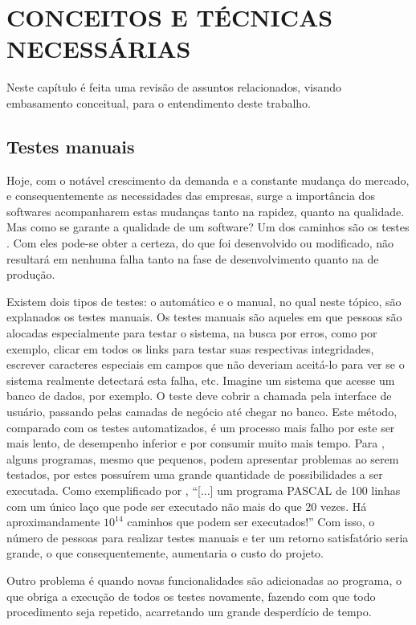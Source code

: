 \chapter{CONCEITOS E TÉCNICAS NECESSÁRIAS}

Neste capítulo é feita uma revisão de assuntos relacionados, visando embasamento conceitual, para o entendimento deste trabalho.

\section{Testes manuais}

Hoje, com o notável crescimento da demanda e a constante mudança do mercado, e consequentemente as necessidades das empresas, surge a importância dos softwares acompanharem estas mudanças tanto na rapidez, quanto na qualidade. Mas como se garante a qualidade de um software? Um dos caminhos são os testes \cite{PRESSMAN}. Com eles pode-se obter a certeza, do que foi desenvolvido ou modificado, não resultará em nenhuma falha tanto na fase de desenvolvimento quanto na de produção.

Existem dois tipos de testes: o automático e o manual, no qual neste tópico, são explanados os testes manuais. Os testes manuais são aqueles em que pessoas são alocadas especialmente para testar o sistema, na busca por erros, como por exemplo, clicar em todos os links para testar suas respectivas integridades, escrever caracteres especiais em campos que não deveriam aceitá-lo para ver se o sistema realmente detectará esta falha, etc. Imagine um sistema que acesse um banco de dados, por exemplo. O teste deve cobrir a chamada pela interface de usuário, passando pelas camadas de negócio até chegar no banco. Este método, comparado com os testes automatizados, é um processo mais falho por este ser mais lento, de desempenho inferior e por consumir muito mais tempo. Para , alguns programas, mesmo que pequenos, podem apresentar problemas ao serem testados, por estes possuírem uma grande quantidade de possibilidades a ser executada. Como exemplificado por , ``[...] um programa PASCAL de 100 linhas com um único laço que pode ser executado não mais do que 20 vezes. Há aproximandamente $10^{14}$ caminhos que podem ser executados!'' Com isso, o número de pessoas para realizar testes manuais e ter um retorno satisfatório seria grande, o que consequentemente, aumentaria o custo do projeto.

Outro problema é quando novas funcionalidades são adicionadas ao programa, o que obriga a execução de todos os testes novamente, fazendo com que todo procedimento seja repetido, acarretando um grande desperdício de tempo.

